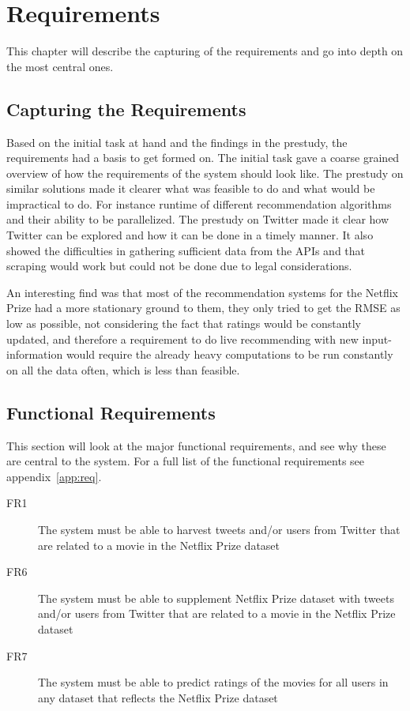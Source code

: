 
\chapter{Requirements}

\minitoc

This chapter will describe the capturing of the requirements and go into depth on the most central ones.

\clearpage

\section{Capturing the Requirements}
Based on the initial task at hand and the findings in the prestudy, the requirements had a basis to get formed on. The initial task gave a coarse grained overview of how the requirements of the system should look like. The prestudy on similar solutions made it clearer what was feasible to do and what would be impractical to do. For instance runtime of different recommendation algorithms and their ability to be parallelized. The prestudy on Twitter made it clear how Twitter can be explored and how it can be done in a timely manner. It also showed the difficulties in gathering sufficient data from the APIs and that scraping would work but could not be done due to legal considerations.

An interesting find was that most of the recommendation systems for the Netflix Prize had a more stationary ground to them, they only tried to get the RMSE as low as possible, not considering the fact that ratings would be constantly updated, and therefore a requirement to do live recommending with new input-information would require the already heavy computations to be run constantly on all the data often, which is less than feasible.


\section{Functional Requirements}\label{section:functional-requirements}
This section will look at the major functional requirements, and see why these are central to the system. For a full list of the functional requirements see appendix~\ref{app:req}.
\begin{description}
  \item[FR1] The system must be able to harvest tweets and/or users from Twitter that are related to a movie in the Netflix Prize dataset
  \item[FR6] The system must be able to supplement Netflix Prize dataset with tweets and/or users from Twitter that are related to a movie in the Netflix Prize dataset
  \item[FR7] The system must be able to predict ratings of the movies for all users in any dataset that reflects the Netflix Prize dataset
\end{description}

